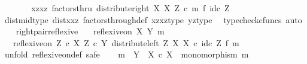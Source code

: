 \begin{isabellebody}
\ \ \ \ \isamarkupfalse%
\ \isamarkupfalse%
\ {\isachardoublequoteopen}{\isasymlangle}{\isasymlangle}x{\isacharcomma}{\kern0pt}z{\isasymrangle}{\isacharcomma}{\kern0pt}{\isasymlangle}x{\isacharcomma}{\kern0pt}z{\isasymrangle}{\isasymrangle}\ factorsthru\ {\isacharparenleft}{\kern0pt}distribute{\isacharunderscore}{\kern0pt}right\ X\ X\ Z\ {\isasymcirc}\isactrlsub c\ m\ {\isasymtimes}\isactrlsub f\ id\isactrlsub c\ Z{\isacharparenright}{\kern0pt}{\isachardoublequoteclose}\isanewline
\ \ \ \ \ \ \isamarkupfalse%
\ dist{\isacharunderscore}{\kern0pt}mid{\isacharunderscore}{\kern0pt}type\ distxxz\ factors{\isacharunderscore}{\kern0pt}through{\isacharunderscore}{\kern0pt}def{}\ xzxz{\isacharunderscore}{\kern0pt}type\ yz{\isacharunderscore}{\kern0pt}type\ \isamarkupfalse%
\ {\isacharparenleft}{\kern0pt}typecheck{\isacharunderscore}{\kern0pt}cfuncs{\isacharcomma}{\kern0pt}\ auto{\isacharparenright}{\kern0pt}\isanewline
\ \ \isamarkupfalse%
\isanewline
{}\isamarkupfalse%
%
\endisatagproof
{\isafoldproof}%
%
\isadelimproof
\isanewline
%
\endisadelimproof
\isanewline
{}\isamarkupfalse%
\ right{\isacharunderscore}{\kern0pt}pair{\isacharunderscore}{\kern0pt}reflexive{\isacharcolon}{\kern0pt}\isanewline
\ \ \ {\isachardoublequoteopen}reflexive{\isacharunderscore}{\kern0pt}on\ X\ {\isacharparenleft}{\kern0pt}Y{\isacharcomma}{\kern0pt}\ m{\isacharparenright}{\kern0pt}{\isachardoublequoteclose}\isanewline
\ \ \ {\isachardoublequoteopen}reflexive{\isacharunderscore}{\kern0pt}on\ {\isacharparenleft}{\kern0pt}Z\ {\isasymtimes}\isactrlsub c\ X{\isacharparenright}{\kern0pt}\ {\isacharparenleft}{\kern0pt}Z\ {\isasymtimes}\isactrlsub c\ Y{\isacharcomma}{\kern0pt}\ distribute{\isacharunderscore}{\kern0pt}left\ Z\ X\ X\ {\isasymcirc}\isactrlsub c\ {\isacharparenleft}{\kern0pt}id\isactrlsub c\ Z\ {\isasymtimes}\isactrlsub f\ m{\isacharparenright}{\kern0pt}{\isacharparenright}{\kern0pt}{\isachardoublequoteclose}\isanewline
%
\isadelimproof
%
\endisadelimproof
%
\isatagproof
{}\isamarkupfalse%
\ {\isacharparenleft}{\kern0pt}unfold\ reflexive{\isacharunderscore}{\kern0pt}on{\isacharunderscore}{\kern0pt}def{\isacharcomma}{\kern0pt}\ safe{\isacharparenright}{\kern0pt}\isanewline
\ \ \isamarkupfalse%
\ {\isachardoublequoteopen}m\ {\isacharcolon}{\kern0pt}\ Y\ {\isasymrightarrow}\ X\ {\isasymtimes}\isactrlsub c\ X\ {\isasymand}\ monomorphism\ m{\isachardoublequoteclose}\isanewline
\ \ \ \ \isamarkupfalse%

\end{isabellebody}

